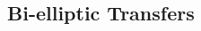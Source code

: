 \documentclass{article}
\begin{document}
\begin{multicols*}{3}
    \subsection*{Bi-elliptic Transfers}

\end{multicols*}  
\end{document}
